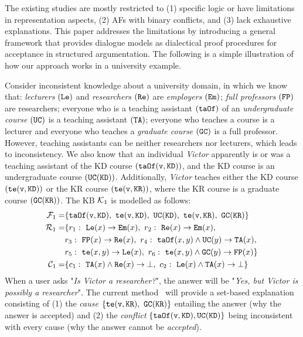The existing studies are mostly restricted to (1) specific logic or have limitations in representation aspects, (2) AFs with binary conflicts, and (3) lack exhaustive explanations. 
This paper addresses the limitations by introducing a general framework that provides dialogue models as dialectical proof procedures for acceptance in structured argumentation.
The following is a simple illustration of how our approach works in a university example.

\begin{example}
\label{ex:motivation-ex}
Consider inconsistent knowledge about a university domain, in which we know that: \emph{lecturers} $(\texttt{\textup{Le}})$ and \emph{researchers} $(\texttt{\textup{Re}})$ are \emph{employers} $(\texttt{\textup{Em}})$; \emph{full professors} $(\texttt{\textup{FP}})$ are researchers; everyone who is a teaching assistant $(\texttt{\textup{taOf}})$ of an \emph{undergraduate course} $(\texttt{\textup{UC}})$ is a teaching assistant $(\texttt{\textup{TA}})$; everyone who teaches a course is a lecturer and everyone who teaches a \emph{graduate course} $(\texttt{\textup{GC}})$ is a full professor. 
However, teaching assistants can be neither researchers nor lecturers, which leads to inconsistency. 
We also know that an individual \emph{Victor}  apparently is or was a teaching assistant of the KD course $(\texttt{\textup{taOf}}(\texttt{\textup{v}}, \texttt{\textup{KD}}))$, and the KD course is an undergraduate course $(\texttt{\textup{UC}}(\texttt{\textup{KD}}))$. Additionally, \emph{Victor} teaches either the KD course $(\texttt{\textup{te}}(\texttt{\textup{v}}, \texttt{\textup{KD}}))$ or the KR course $(\texttt{\textup{te}}(\texttt{\textup{v}}, \texttt{\textup{KR}}))$, where the KR course is a graduate course $(\texttt{\textup{GC}}(\texttt{\textup{KR}}))$.
The KB $\mathcal{K}_1$ is modelled as follows:
%
\begin{align*}
\mathcal{F}_1 = & \{\texttt{\textup{taOf}}(\texttt{\textup{v}},\texttt{\textup{KD}}),\ \texttt{\textup{te}}(\texttt{\textup{v}}, \texttt{\textup{KD}}),\ \texttt{\textup{UC}}(\texttt{\textup{KD}}),\ \texttt{\textup{te}}(\texttt{\textup{v}},\texttt{\textup{KR}}),\ \texttt{\textup{GC}}(\texttt{\textup{KR}}) \} \\
\mathcal{R}_1 = & \{ r_1:\ \texttt{\textup{Le}}(x) \rightarrow \texttt{\textup{Em}}(x) ,\
  r_2:\ \texttt{\textup{Re}}(x) \rightarrow \texttt{\textup{Em}}(x),\ \\
& r_3:\ \texttt{\textup{FP}}(x) \rightarrow \texttt{\textup{Re}}(x) ,\
  r_4:\ \texttt{\textup{taOf}}(x,y) \land \texttt{\textup{UC}}(y)  \rightarrow \texttt{\textup{TA}}(x),\ \\
& r_5:\ \texttt{\textup{te}}(x,y) \rightarrow \texttt{\textup{Le}}(x),\
  r_6:\ \texttt{\textup{te}}(x,y) \land \texttt{\textup{GC}}(y)  \rightarrow \texttt{\textup{FP}}(x) \} \\
\mathcal{C}_1 = & \{ c_1:\ \texttt{\textup{TA}}(x) \land \texttt{\textup{Re}}(x) \rightarrow \bot,\
  c_2:\ \texttt{\textup{Le}}(x) \land \texttt{\textup{TA}}(x) \rightarrow \bot\}
\end{align*}
%
%
When a user asks "\emph{Is Victor a researcher?}", the answer will be "\emph{Yes, but Victor is possibly a researcher}". 
The current method~\cite{Lukasiewicz2020,Thomas2022Neg,Meghyn2019} will provide a set-based explanation consisting of (1) the \emph{cause} $\{\texttt{\textup{te}}(\texttt{\textup{v}},\texttt{\textup{KR}}),\ \texttt{\textup{GC}}(\texttt{\textup{KR}})\}$ entailing the answer (why the answer is accepted) and (2) the \emph{conflict} $\{\texttt{\textup{taOf}}(\texttt{\textup{v}},\texttt{\textup{KD}}), \texttt{\textup{UC}}(\texttt{\textup{KD}}) \}$ being inconsistent with every cause (why the answer cannot be \textit{accepted}).

\end{example}
